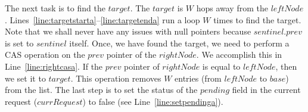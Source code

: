 \documentclass{llncs}
\begin{document}
\begin{appendix}
The next task is to find the $target$. The $target$ is $W$ hops away from the $leftNode$.
Lines~\ref{line:targetstarta}--\ref{line:targetenda} run a loop $W$ times to find the target. Note that we shall never
have any issues with null pointers because $sentinel.prev$ is set to $sentinel$ itself. Once, we have found the
target, we need to perform a CAS operation on the $prev$ pointer of the $rightNode$. We accomplish this in
Line~\ref{line:rightcasa}. If the $prev$ pointer of $rightNode$ is equal to $leftNode$, then we set it to $target$.
This operation removes $W$ entries (from $leftNode$ to $base$) from the list. The last step is to set the 
status of the $pending$ field in the current request ($currRequest$) to false (see Line~\ref{line:setpendinga}).


\end{appendix}
\end{document}
